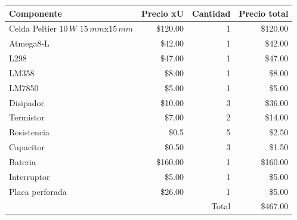 \documentclass[10pt,spanish,a4paper,openany,notitlepage]{article}
\begin{document}
\begin{center}
\begin{tabular}{|l|r|r|r|}\hline
Componente&Precio xU&Cantidad&Precio total\\ \hline
Celda Peltier $10\, \unit{W}$ $15\, \unit{mm}$x$15\, \unit{mm}$ &\$120.00&1&\$120.00\\ \hline
Atmega8-L &\$42.00&1&\$42.00\\ \hline
L298 &\$47.00&1&\$47.00\\ \hline
LM358 &\$8.00&1&\$8.00\\ \hline
LM7850 &\$5.00&1&\$5.00\\ \hline
Disipador &\$10.00&3&\$36.00\\ \hline
Termistor &\$7.00&2&\$14.00\\ \hline
Resistencia &\$0.5&5&\$2.50\\ \hline
Capacitor &\$0.50&3&\$1.50\\ \hline 
Bateria &\$160.00&1&\$160.00\\ \hline
Interruptor &\$5.00&1&\$5.00\\ \hline
Placa perforada &\$26.00&1&\$5.00\\ \hline
\multicolumn{3}{|r|}{Total}&\$467.00\\ \hline
\end{tabular}
\end{center}
\end{document}
